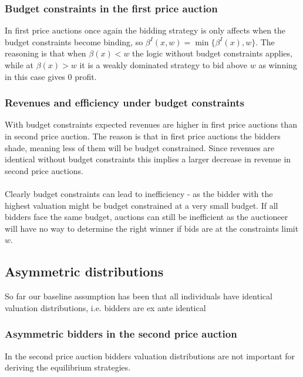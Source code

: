 \subsubsection{Budget constraints in the first price auction}
In first price auctions once again the bidding strategy is only affects when the budget constraints become binding, so $\beta^I(x,w)=\min\{\beta^I(x), w\}$. The reasoning is that when $\beta(x)<w$ the logic without budget constraints applies, while at $\beta(x)>w$ it is a weakly dominated strategy to bid above $w$ as winning in this case gives 0 profit.

\subsubsection{Revenues and efficiency under budget constraints}
With budget constraints expected revenues are higher in first price auctions than in second price auction. The reason is that in first price auctions the bidders shade, meaning less of them will be budget constrained. Since revenues are identical without budget constraints this implies a larger decrease in revenue in second price auctions.
\\ \\
Clearly budget constraints can lead to inefficiency - as the bidder with the highest valuation might be budget constrained at a very small budget. If all bidders face the same budget, auctions can still be inefficient as the auctioneer will have no way to determine the right winner if bids are at the constraints limit $w$.


\subsection{Asymmetric distributions}
So far our baseline assumption has been that all individuals have identical valuation distributions, i.e. bidders are ex ante identical

\subsubsection{Asymmetric bidders in the second price auction}
In the second price auction bidders valuation distributions are not important for deriving the equilibrium strategies.

